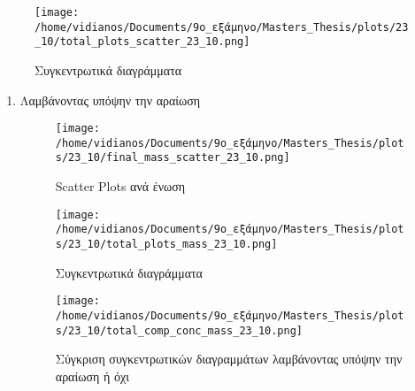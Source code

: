 \documentclass[11pt]{article}
\begin{document}
\begin{figure}[htbp]
\centering
\texttt{[image: /home/vidianos/Documents/9o\_εξάμηνο/Masters\_Thesis/plots/23\_10/total\_plots\_scatter\_23\_10.png]}
\caption{Συγκεντρωτικά διαγράμματα}
\end{figure}

\pagebreak
\begin{enumerate}
\item Λαμβάνοντας υπόψην την αραίωση
\label{sec:org89568fe}
\begin{figure}[htbp]
\centering
\texttt{[image: /home/vidianos/Documents/9o\_εξάμηνο/Masters\_Thesis/plots/23\_10/final\_mass\_scatter\_23\_10.png]}
\caption{Scatter Plots ανά ένωση}
\end{figure}

\begin{figure}[htbp]
\centering
\texttt{[image: /home/vidianos/Documents/9o\_εξάμηνο/Masters\_Thesis/plots/23\_10/total\_plots\_mass\_23\_10.png]}
\caption{Συγκεντρωτικά διαγράμματα}
\end{figure}

\begin{figure}[htbp]
\centering
\texttt{[image: /home/vidianos/Documents/9o\_εξάμηνο/Masters\_Thesis/plots/23\_10/total\_comp\_conc\_mass\_23\_10.png]}
\caption{Σύγκριση συγκεντρωτικών διαγραμμάτων λαμβάνοντας υπόψην την αραίωση ή όχι}
\end{figure}
\end{enumerate}
\end{document}
